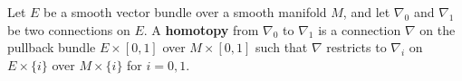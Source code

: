 Let $E$ be a smooth vector bundle over a smooth manifold $M$, and let $\nabla_0$ and $\nabla_1$ be two connections on $E$. A \textbf{homotopy} from $\nabla_0$ to $\nabla_1$ is a connection $\nabla$ on the pullback bundle $E \times [0,1]$ over $M \times [0,1]$ such that $\nabla$ restricts to $\nabla_i$ on $E \times \{i\}$ over $M \times \{i\}$ for $i = 0, 1$.
